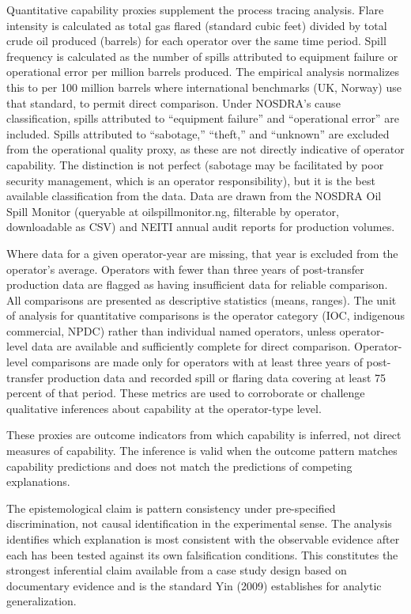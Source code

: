 \documentclass[twoside,fontset=lmodern]{mitthesis}
\begin{document}
Quantitative capability proxies supplement the process tracing analysis.
Flare intensity is calculated as total gas flared (standard cubic feet)
divided by total crude oil produced (barrels) for each operator over the
same time period. Spill frequency is calculated as the number of spills
attributed to equipment failure or operational error per million barrels
produced. The empirical analysis normalizes this to per 100 million
barrels where international benchmarks (UK, Norway) use that standard,
to permit direct comparison. Under NOSDRA's cause classification, spills
attributed to ``equipment failure'' and ``operational error'' are
included. Spills attributed to ``sabotage,'' ``theft,'' and ``unknown''
are excluded from the operational quality proxy, as these are not
directly indicative of operator capability. The distinction is not
perfect (sabotage may be facilitated by poor security management, which
is an operator responsibility), but it is the best available
classification from the data. Data are drawn from the NOSDRA Oil Spill
Monitor (queryable at oilspillmonitor.ng, filterable by operator,
downloadable as CSV) and NEITI annual audit reports for production
volumes.

Where data for a given operator-year are missing, that year is excluded
from the operator's average. Operators with fewer than three years of
post-transfer production data are flagged as having insufficient data
for reliable comparison. All comparisons are presented as descriptive
statistics (means, ranges). The unit of analysis for quantitative
comparisons is the operator category (IOC, indigenous commercial, NPDC)
rather than individual named operators, unless operator-level data are
available and sufficiently complete for direct comparison.
Operator-level comparisons are made only for operators with at least
three years of post-transfer production data and recorded spill or
flaring data covering at least 75 percent of that period. These metrics
are used to corroborate or challenge qualitative inferences about
capability at the operator-type level.

These proxies are outcome indicators from which capability is inferred,
not direct measures of capability. The inference is valid when the
outcome pattern matches capability predictions and does not match the
predictions of competing explanations.

The epistemological claim is pattern consistency under pre-specified
discrimination, not causal identification in the experimental sense. The
analysis identifies which explanation is most consistent with the
observable evidence after each has been tested against its own
falsification conditions. This constitutes the strongest inferential
claim available from a case study design based on documentary evidence
and is the standard Yin (2009) establishes for analytic generalization.
\end{document}
